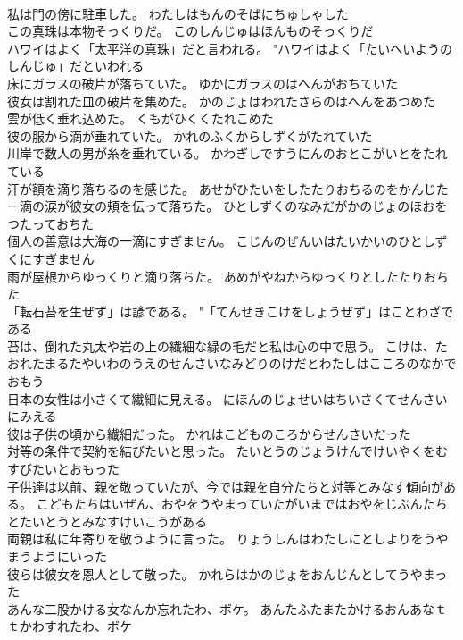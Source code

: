 \documentclass[8pt]{extreport}
\begin{document}
\begin{CJK}{UTF8}{min}
\\	私は門の傍に駐車した。	わたしはもんのそばにちゅしゃした 
\\	この真珠は本物そっくりだ。	このしんじゅはほんものそっくりだ 
\\	ハワイはよく「太平洋の真珠」だと言われる。	"ハワイはよく「たいへいようのしんじゅ」だといわれる 
\\	床にガラスの破片が落ちていた。	ゆかにガラスのはへんがおちていた 
\\	彼女は割れた皿の破片を集めた。	かのじょはわれたさらのはへんをあつめた 
\\	雲が低く垂れ込めた。	くもがひくくたれこめた 
\\	彼の服から滴が垂れていた。	かれのふくからしずくがたれていた 
\\	川岸で数人の男が糸を垂れている。	かわぎしですうにんのおとこがいとをたれている 
\\	汗が額を滴り落ちるのを感じた。	あせがひたいをしたたりおちるのをかんじた 
\\	一滴の涙が彼女の頬を伝って落ちた。	ひとしずくのなみだがかのじょのほおをつたっておちた 
\\	個人の善意は大海の一滴にすぎません。	こじんのぜんいはたいかいのひとしずくにすぎません 
\\	雨が屋根からゆっくりと滴り落ちた。	あめがやねからゆっくりとしたたりおちた 
\\	「転石苔を生ぜず」は諺である。	"「てんせきこけをしょうぜず」はことわざである 
\\	苔は、倒れた丸太や岩の上の繊細な緑の毛だと私は心の中で思う。	こけは、たおれたまるたやいわのうえのせんさいなみどりのけだとわたしはこころのなかでおもう 
\\	日本の女性は小さくて繊細に見える。	にほんのじょせいはちいさくてせんさいにみえる 
\\	彼は子供の頃から繊細だった。	かれはこどものころからせんさいだった 
\\	対等の条件で契約を結びたいと思った。	たいとうのじょうけんでけいやくをむすびたいとおもった 
\\	子供達は以前、親を敬っていたが、今では親を自分たちと対等とみなす傾向がある。	こどもたちはいぜん、おやをうやまっていたがいまではおやをじぶんたちとたいとうとみなすけいこうがある 
\\	両親は私に年寄りを敬うように言った。	りょうしんはわたしにとしよりをうやまうようにいった 
\\	彼らは彼女を恩人として敬った。	かれらはかのじょをおんじんとしてうやまった 
\\	あんな二股かける女なんか忘れたわ、ボケ。	あんたふたまたかけるおんあなｔｔかわすれたわ、ボケ 

\end{CJK}
\end{document}
